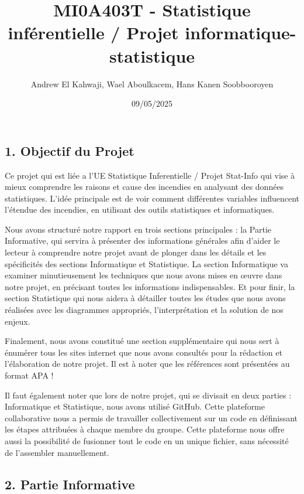 \documentclass[
]{article}
\title{MI0A403T - Statistique inférentielle / Projet
informatique-statistique}
\author{Andrew El Kahwaji, Wael Aboulkacem, Hans Kanen Soobbooroyen}
\date{09/05/2025}
\begin{document}
\maketitle

{
\setcounter{tocdepth}{3}
\tableofcontents
}
\subsection{1. Objectif du Projet}\label{objectif-du-projet}

Ce projet qui est liée a l'UE Statistique Inferentielle / Projet
Stat-Info qui vise à mieux comprendre les raisons et cause des incendies
en analysant des données statistiques. L'idée principale est de voir
comment différentes variables influencent l'étendue des incendies, en
utilisant des outils statistiques et informatiques.

Nous avons structuré notre rapport en trois sections principales : la
Partie Informative, qui servira à présenter des informations générales
afin d'aider le lecteur à comprendre notre projet avant de plonger dans
les détails et les spécificités des sections Informatique et
Statistique. La section Informatique va examiner minutieusement les
techniques que nous avons mises en œuvre dans notre projet, en précisant
toutes les informations indispensables. Et pour finir, la section
Statistique qui nous aidera à détailler toutes les études que nous avons
réalisées avec les diagrammes appropriés, l'interprétation et la
solution de nos enjeux.

Finalement, nous avons constitué une section supplémentaire qui nous
sert à énumérer tous les sites internet que nous avons consultés pour la
rédaction et l'élaboration de notre projet. Il est à noter que les
références sont présentées au format APA !

Il faut également noter que lors de notre projet, qui se divisait en
deux parties : Informatique et Statistique, nous avons utilisé GitHub.
Cette plateforme collaborative nous a permis de travailler
collectivement sur un code en définissant les étapes attribuées à chaque
membre du groupe. Cette plateforme nous offre aussi la possibilité de
fusionner tout le code en un unique fichier, sans nécessité de
l'assembler manuellement.

\subsection{2. Partie Informative}\label{partie-informative}
\end{document}
